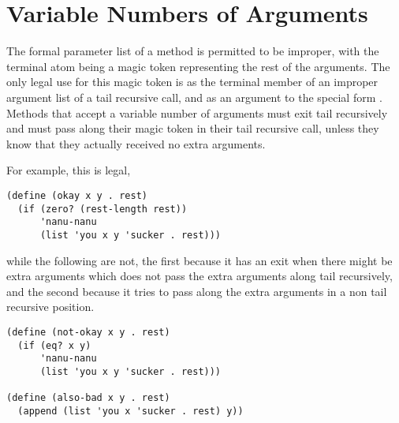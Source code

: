





\section{Variable Numbers of Arguments} \label{sec:varargs}

The formal parameter list of a method is permitted to be improper,
with the terminal atom being a magic token representing the rest of
the arguments.  The only legal use for this magic token is as the
terminal member of an improper argument list of a tail recursive call,
and as an argument to the special form .  Methods that
accept a variable number of arguments must exit tail recursively and
must pass along their magic token in their tail recursive call, unless
they know that they actually received no extra arguments.


For example, this is legal,
\begin{verbatim}
(define (okay x y . rest)
  (if (zero? (rest-length rest))
      'nanu-nanu
      (list 'you x y 'sucker . rest)))
\end{verbatim}
while the following are not, the first because it has an exit when
there might be extra arguments which does not pass the extra arguments
along tail recursively, and the second because it tries to pass along
the extra arguments in a non tail recursive position.
\begin{verbatim}
(define (not-okay x y . rest)
  (if (eq? x y)
      'nanu-nanu
      (list 'you x y 'sucker . rest)))

(define (also-bad x y . rest)
  (append (list 'you x 'sucker . rest) y))
\end{verbatim}

